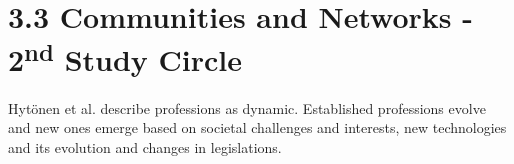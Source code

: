 \section*{3.3 Communities and Networks - 2\textsuperscript{nd} Study Circle}

Hytönen et al. \cite{hytonen2014does} describe professions as dynamic. Established professions evolve and new ones emerge based on societal challenges and interests, new technologies and its evolution and changes in legislations.    

